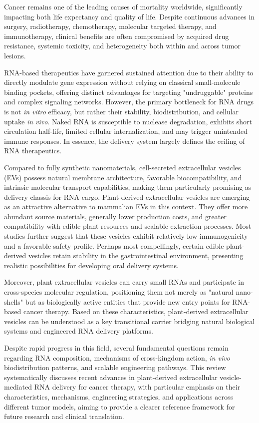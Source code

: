 
Cancer remains one of the leading causes of mortality worldwide, significantly impacting both life expectancy and quality of life. Despite continuous advances in surgery, radiotherapy, chemotherapy, molecular targeted therapy, and immunotherapy, clinical benefits are often compromised by acquired drug resistance, systemic toxicity, and heterogeneity both within and across tumor lesions.

RNA-based therapeutics have garnered sustained attention due to their ability to directly modulate gene expression without relying on classical small-molecule binding pockets, offering distinct advantages for targeting "undruggable" proteins and complex signaling networks. However, the primary bottleneck for RNA drugs is not \textit{in vitro} efficacy, but rather their stability, biodistribution, and cellular uptake \textit{in vivo}. Naked RNA is susceptible to nuclease degradation, exhibits short circulation half-life, limited cellular internalization, and may trigger unintended immune responses. In essence, the delivery system largely defines the ceiling of RNA therapeutics.

Compared to fully synthetic nanomaterials, cell-secreted extracellular vesicles (EVs) possess natural membrane architecture, favorable biocompatibility, and intrinsic molecular transport capabilities, making them particularly promising as delivery chassis for RNA cargo. Plant-derived extracellular vesicles are emerging as an attractive alternative to mammalian EVs in this context. They offer more abundant source materials, generally lower production costs, and greater compatibility with edible plant resources and scalable extraction processes. Most studies further suggest that these vesicles exhibit relatively low immunogenicity and a favorable safety profile. Perhaps most compellingly, certain edible plant-derived vesicles retain stability in the gastrointestinal environment, presenting realistic possibilities for developing oral delivery systems.

Moreover, plant extracellular vesicles can carry small RNAs and participate in cross-species molecular regulation, positioning them not merely as "natural nano-shells" but as biologically active entities that provide new entry points for RNA-based cancer therapy. Based on these characteristics, plant-derived extracellular vesicles can be understood as a key transitional carrier bridging natural biological systems and engineered RNA delivery platforms.

Despite rapid progress in this field, several fundamental questions remain regarding RNA composition, mechanisms of cross-kingdom action, \textit{in vivo} biodistribution patterns, and scalable engineering pathways. This review systematically discusses recent advances in plant-derived extracellular vesicle-mediated RNA delivery for cancer therapy, with particular emphasis on their characteristics, mechanisms, engineering strategies, and applications across different tumor models, aiming to provide a clearer reference framework for future research and clinical translation.
